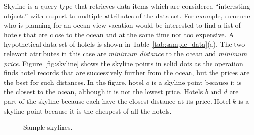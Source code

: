 
Skyline is a query type that retrieves data items which are
considered ``interesting objects'' with respect to multiple
attributes of the data set. For example, someone who is planning
for an ocean-view vacation would be interested to find a list of
hotels that are close to the ocean and at the same time not too
expensive. A hypothetical data set of hotels is shown in
Table~\ref{tab:sample_data}(a). The two relevant attributes in
this case are \emph{minimum distance} to the ocean and
\emph{minimum price}. Figure~\ref{fig:skyline} shows the skyline
points in solid dots as the operation finds hotel records that are
successively further from the ocean, but the prices are the best
for such distances. In the figure, hotel $a$ is a skyline point
because it is the closest to the ocean, although it is not the
lowest price. Hotels $b$ and $d$ are part of the skyline because
each have the closest distance at its price. Hotel $k$ is a
skyline point because it is the cheapest of all the hotels.

\begin{figure}[!h]
\centering {}  \vspace*{-5pt}\caption{Sample skylines.} \vspace*{-5pt}
\end{figure}

